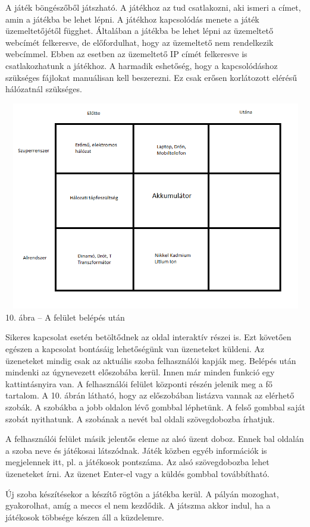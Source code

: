 \documentclass[bibliography=totocnumbered]{article}
\begin{document}
A játék böngészőből játszható. A játékhoz az tud csatlakozni, aki ismeri
a címet, amin a játékba be lehet lépni. A játékhoz kapcsolódás menete a
játék üzemeltetőjétől függhet. Általában a játékba be lehet lépni az
üzemeltető webcímét felkeresve, de előfordulhat, hogy az üzemeltető nem
rendelkezik webcímmel. Ebben az esetben az üzemeltető IP címét
felkeresve is csatlakozhatunk a játékhoz. A harmadik eshetőség, hogy a
kapcsolódáshoz szükséges fájlokat manuálisan kell beszerezni. Ez csak
erősen korlátozott elérésű hálózatnál szükséges.

\includegraphics[width=5.90551in,height=3.59853in]{media/image7.png}10.
ábra -- A felület belépés után

Sikeres kapcsolat esetén betöltődnek az oldal interaktív részei is. Ezt
követően egészen a kapcsolat bontásáig lehetőségünk van üzeneteket
küldeni. Az üzeneteket mindig csak az aktuális szoba felhasználói kapják
meg. Belépés után mindenki az úgynevezett előszobába kerül. Innen már
minden funkció egy kattintásnyira van. A felhasználói felület központi
részén jelenik meg a fő tartalom. A 10. ábrán látható, hogy az
előszobában listázva vannak az elérhető szobák. A szobákba a jobb
oldalon lévő gombbal léphetünk. A felső gombbal saját szobát nyithatunk.
A szobának a nevét bal oldali szövegdobozba írhatjuk.

A felhasználói felület másik jelentős eleme az alsó üzent doboz. Ennek
bal oldalán a szoba neve és játékosai látszódnak. Játék közben egyéb
információk is megjelennek itt, pl. a játékosok pontszáma. Az alsó
szövegdobozba lehet üzeneteket írni. Az üzenet Enter-el vagy a küldés
gombbal továbbítható.

Új szoba készítésekor a készítő rögtön a játékba kerül. A pályán
mozoghat, gyakorolhat, amíg a meccs el nem kezdődik. A játszma akkor
indul, ha a játékosok többsége készen áll a küzdelemre.
\end{document}
